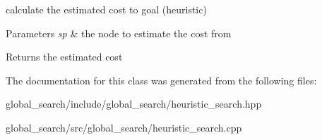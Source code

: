 calculate the estimated cost to goal (heuristic) 


\begin{DoxyParams}{Parameters}
{\em sp} & the node to estimate the cost from \\
\hline
\end{DoxyParams}
\begin{DoxyReturn}{Returns}
the estimated cost 
\end{DoxyReturn}


The documentation for this class was generated from the following files\+:\begin{DoxyCompactItemize}
\item 
global\+\_\+search/include/global\+\_\+search/heuristic\+\_\+search.\+hpp\item 
global\+\_\+search/src/global\+\_\+search/heuristic\+\_\+search.\+cpp\end{DoxyCompactItemize}
